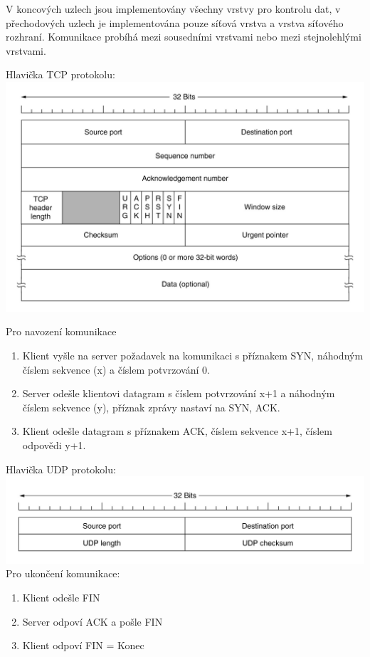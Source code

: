 V koncových uzlech jsou implementovány všechny vrstvy pro kontrolu dat, v přechodových uzlech je implementována pouze síťová vrstva a vrstva síťového rozhraní.
Komunikace probíhá mezi sousedními vrstvami nebo mezi stejnolehlými vrstvami.
\begin{multicols}{2}
  Hlavička TCP protokolu: \\
  \includegraphics[width=\linewidth]{TVY-POS/ISO-OSI-TCP-IP/TCPheader.jpg}
  \columnbreak

  Pro navození komunikace
  \begin{enumerate}
    \item Klient vyšle na server požadavek na komunikaci s příznakem SYN, náhodným číslem sekvence (x) a číslem potvrzování 0.
    \item Server odešle klientovi datagram s číslem potvrzování x+1 a náhodným číslem sekvence (y), příznak zprávy nastaví na SYN, ACK.
    \item Klient odešle datagram s příznakem ACK, číslem sekvence x+1, číslem odpovědi y+1.
  \end{enumerate}
\end{multicols}
\begin{multicols}{2}
  Hlavička UDP protokolu: \\
  \includegraphics[width=\linewidth]{TVY-POS/ISO-OSI-TCP-IP/UDPheader.jpg}
  \columnbreak
  \newline
  Pro ukončení komunikace:
  \begin{enumerate}
    \item Klient odešle FIN
    \item Server odpoví ACK a pošle FIN
    \item Klient odpoví FIN = Konec
  \end{enumerate}
\end{multicols}

